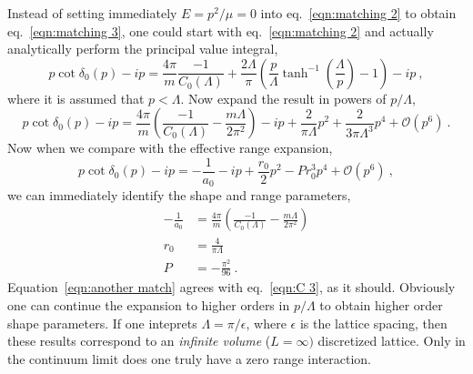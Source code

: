 \documentclass[11pt]{article}
\begin{document}
Instead of setting immediately $E=p^2/\mu = 0$ into eq.~\eqref{eqn:matching 2} to obtain eq.~\eqref{eqn:matching 3}, one could start with eq.~\eqref{eqn:matching 2} and actually analytically perform the principal value integral,
\begin{equation}\label{eqn:effective range 1}
p\cot \delta_0(p)-ip=\frac{4\pi}{m}\frac{-1}{C_0(\Lambda)}+\frac{2\Lambda}{\pi} \left(\frac{p}{\Lambda} \tanh ^{-1}\left(\frac{\Lambda }{p}\right)-1 \right)-ip\ ,
\end{equation}
where it is assumed that $p<\Lambda$.  Now expand the result in powers of $p/\Lambda$, 
\begin{equation}\label{eqn:effective range 2}
p\cot \delta_0(p)-ip=\frac{4\pi}{m}\left(\frac{-1}{C_0(\Lambda)}-\frac{m\Lambda}{2\pi^2}\right)-ip+\frac{2}{\pi\Lambda}p^2+\frac{2}{3\pi\Lambda^3}p^4+\mathcal{O}(p^6)\ .
\end{equation}
Now when we compare with the effective range expansion,
\begin{displaymath}
p\cot \delta_0(p)-ip=-\frac{1}{a_0}-ip+\frac{r_0}{2}p^2-Pr_0^3p^4+\mathcal{O}(p^6)\ ,
\end{displaymath}
we can immediately identify the shape and range parameters,
\begin{align}
-\frac{1}{a_0}&=\frac{4\pi}{m}\left(\frac{-1}{C_0(\Lambda)}-\frac{m\Lambda}{2\pi^2}\right)\label{eqn:another match}\\
r_0 &= \frac{4}{\pi\Lambda}\\
P &= -\frac{\pi^2}{96}\ .
\end{align}
Equation~\eqref{eqn:another match} agrees with eq.~\eqref{eqn:C 3}, as it should.  Obviously one can continue the expansion to higher orders in $p/\Lambda$ to obtain higher order shape parameters.  If one inteprets $\Lambda=\pi/\epsilon$, where $\epsilon$ is the lattice spacing, then these results correspond to an \emph{infinite volume} ($L=\infty)$ discretized lattice.  Only in the continuum limit does one truly have a zero range interaction.
\end{document}
